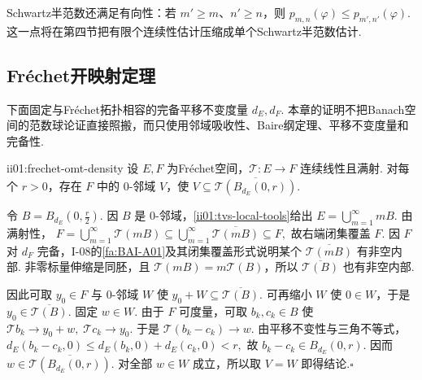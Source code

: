 Schwartz半范数还满足有向性：若 \(\displaystyle m'\geqslant m\)、\(\displaystyle n'\geqslant n\)，则
\(\displaystyle p_{m,n}(\varphi) \leqslant p_{m',n'}(\varphi).\)
这一点将在第四节把有限个连续性估计压缩成单个Schwartz半范数估计.

\subsection{Fr\'echet开映射定理}

下面固定与Fr\'echet拓扑相容的完备平移不变度量 \(\displaystyle d_E,d_F\). 本章的证明不把Banach空间的范数球论证直接照搬，而只使用邻域吸收性、Baire纲定理、平移不变度量和完备性.

\begin{FALemma}[B][Baire稠密邻域引理]{ii01:frechet-omt-density}
设 \(\displaystyle E,F\) 为Fr\'echet空间，\(\displaystyle \mathcal T:E\to F\) 连续线性且满射. 对每个 \(\displaystyle r>0\)，存在 \(\displaystyle F\) 中的 \(\displaystyle0\)-邻域 \(\displaystyle V\)，使
\(\displaystyle V \subseteq \overline{\mathcal T(B_{d_E}(0,r))}.\)
\end{FALemma}

\begin{FAProof}
令 \(\displaystyle B=B_{d_E}(0,\frac{r}{2})\). 因 \(\displaystyle B\) 是 \(\displaystyle0\)-邻域，\autoref{ii01:tvs-local-tools}给出
\(\displaystyle E= \bigcup_{m=1}^{\infty}mB.\)
由满射性，
\(\displaystyle F = \bigcup_{m=1}^{\infty}\mathcal T(mB) \subseteq \bigcup_{m=1}^{\infty}\overline{\mathcal T(mB)} \subseteq F,\)
故右端闭集覆盖 \(\displaystyle F\). 因 \(\displaystyle F\) 对 \(\displaystyle d_F\) 完备，I-08的\autoref{fa:BAI-A01}及其闭集覆盖形式说明某个 \(\displaystyle \overline{\mathcal T(mB)}\) 有非空内部. 非零标量伸缩是同胚，且 \(\displaystyle \mathcal T(mB)=m\mathcal T(B)\)，所以 \(\displaystyle \overline{\mathcal T(B)}\) 也有非空内部.

因此可取 \(\displaystyle y_0\in F\) 与 \(\displaystyle0\)-邻域 \(\displaystyle W\) 使
\(\displaystyle y_0+W \subseteq \overline{\mathcal T(B)}.\)
可再缩小 \(\displaystyle W\) 使 \(\displaystyle0\in W\)，于是 \(\displaystyle y_0\in\overline{\mathcal T(B)}\). 固定 \(\displaystyle w\in W\). 由于 \(\displaystyle F\) 可度量，可取 \(\displaystyle b_k,c_k\in B\) 使
\(\displaystyle \mathcal Tb_k\to y_0+w,\; \mathcal Tc_k\to y_0.\)
于是 \(\displaystyle \mathcal T(b_k-c_k)\to w\). 由平移不变性与三角不等式，
\(\displaystyle d_E(b_k-c_k,0) \leqslant d_E(b_k,0)+d_E(c_k,0) <r,\)
故 \(\displaystyle b_k-c_k\in B_{d_E}(0,r)\). 因而 \(\displaystyle w\in\overline{\mathcal T(B_{d_E}(0,r))}\). 对全部 \(\displaystyle w\in W\) 成立，所以取 \(\displaystyle V=W\) 即得结论.\hfill\(\square\)
\end{FAProof}

